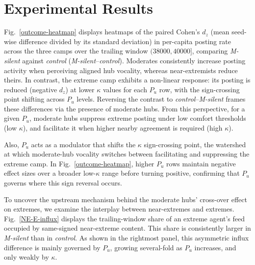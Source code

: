 \documentclass{svproc}
\def\VCR{\kappa}                 %
\begin{document}
\section{Experimental Results}\label{sec:results}
Fig.~\ref{outcome-heatmap} displays heatmaps of the paired Cohen's
$d_z$ (mean seed-wise difference divided by its standard deviation) in
per-capita posting rate across the three camps over the trailing
window $(38000, 40000]$, comparing \emph{M-silent} against
\emph{control} (\emph{M-silent}--\emph{control}). Moderates
consistently increase posting activity when perceiving aligned hub
vocality, whereas near-extremists reduce theirs. In contrast, the
extreme camp exhibits a non-linear response: its posting is reduced
(negative $d_z$) at lower $\VCR$ values for each $P_u$ row, with the
sign-crossing point shifting across $P_u$ levels. Reversing the
contrast to \emph{control}--\emph{M-silent} frames these differences
via the presence of moderate hubs. From this perspective, for a given
$P_u$, moderate hubs suppress extreme posting under low comfort
thresholds (low $\VCR$), and facilitate it when higher nearby
agreement is required (high $\VCR$).
\par


Also, $P_u$ acts as a modulator that shifts the $\VCR$ sign-crossing
point, the watershed at which moderate-hub vocality switches between
facilitating and suppressing the extreme camp. In
Fig.~\ref{outcome-heatmap}, higher $P_u$ rows maintain negative effect
sizes over a broader low-$\VCR$ range before turning positive,
confirming that $P_u$ governs where this sign reversal occurs.
\par

To uncover the upstream mechanism behind the moderate hubs' cross-over
effect on extremes, we examine the interplay between near-extremes and
extremes. Fig.~\ref{NE-E-influx} displays the trailing-window share of
an extreme agent's feed occupied by same-signed near-extreme
content. This share is consistently larger in \emph{M-silent} than in
\emph{control}. As shown in the rightmost panel, this asymmetric
influx difference is mainly governed by $P_u$, growing several-fold as
$P_u$ increases, and only weakly by $\VCR$.
\par
\end{document}
